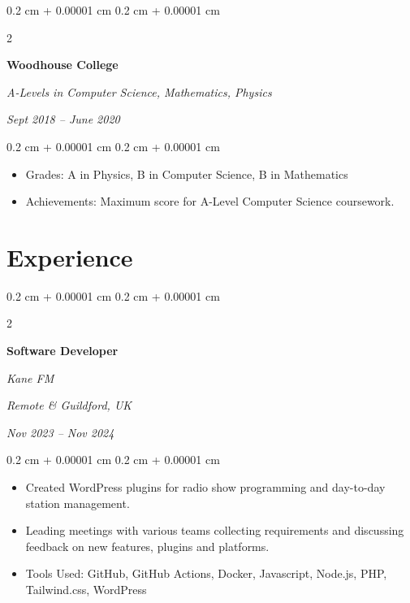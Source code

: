 \documentclass[10pt, letterpaper]{article}
\newenvironment{highlights}{
    \begin{itemize}[
        topsep=0.10 cm,
        parsep=0.10 cm,
        partopsep=0pt,
        itemsep=0pt,
        leftmargin=0.4 cm + 10pt
    ]
}{
    \end{itemize}
} %
\newenvironment{onecolentry}{
    \begin{adjustwidth}{
        0.2 cm + 0.00001 cm
    }{
        0.2 cm + 0.00001 cm
    }
}{
    \end{adjustwidth}
} %
\newenvironment{twocolentry}[2][]{
    \onecolentry
    \def\secondColumn{#2}
    \setcolumnwidth{\fill, 8 cm}
    \begin{paracol}{2}
}{
    \switchcolumn \raggedleft \secondColumn
    \end{paracol}
    \endonecolentry
} %
\begin{document}
        \vspace{0.2 cm}

        \begin{twocolentry}{
            
            
        \textit{Sept 2018 – June 2020}}
            \textbf{Woodhouse College}

            \textit{A-Levels in Computer Science, Mathematics, Physics}
        \end{twocolentry}

        \vspace{0.10 cm}
        \begin{onecolentry}
            \begin{highlights}
                \item Grades: A in Physics, B in Computer Science, B in Mathematics
                \item Achievements: Maximum score for A-Level Computer Science coursework.
            \end{highlights}
        \end{onecolentry}



    
    \section{Experience}



        
        \begin{twocolentry}{
        \textit{Remote \& Guildford, UK}    
            
        \textit{Nov 2023 – Nov 2024}}
            \textbf{Software Developer}
            
            \textit{Kane FM}
        \end{twocolentry}

        \vspace{0.10 cm}
        \begin{onecolentry}
            \begin{highlights}
                \item Created WordPress plugins for radio show programming and day-to-day station management.
                \item Leading meetings with various teams collecting requirements and discussing feedback on new features, plugins and platforms.
                \item Tools Used: GitHub, GitHub Actions, Docker, Javascript, Node.js, PHP, Tailwind.css, WordPress
            \end{highlights}
        \end{onecolentry}
\end{document}
